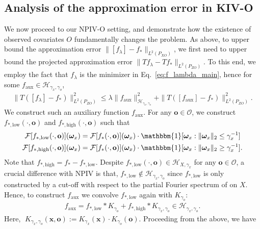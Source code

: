 \documentclass[11pt]{article}
\newcommand{\one}{\mathbbm{1}}
\newcommand{\bx}{\mathbf x}
\newcommand{\bo}{\mathbf o}
\newcommand{\bomega}{\boldsymbol{\omega}}
\newcommand{\calF}{\mathcal{F}}
\newcommand{\calH}{\mathcal{H}}
\newcommand{\calO}{\mathcal{O}}
\newcommand{\0}{\mathbf{0}}
\begin{document}
\subsection{Analysis of the approximation error in KIV-O} \label{sec:analysis_npivo} 
We now proceed to our NPIV-O setting, and demonstrate how the existence of observed covariates $O$ fundamentally changes the problem. As above, to upper bound the approximation error $\|[f_{\lambda}] - f_{\ast}\|_{L^2(P_{XO})}$, we first need to upper bound the projected approximation error $\|T f_{\lambda} - T f_{\ast}\|_{L^2(P_{ZO})}$. To this end, we employ the fact that $f_{\lambda}$ is the minimizer in Eq.~\eqref{eq:f_lambda_main}, hence for some $f_{\mathrm{aux}} \in \calH_{\gamma_x,\gamma_o}$,
\begin{align*}
    \|T([f_{\lambda}] - f_{\ast})\|^2_{L^2(P_{ZO})} \leq \lambda \|f_{\mathrm{aux}}\|^2_{\calH_{\gamma_x,\gamma_o}} + \|T([f_{\mathrm{aux}}] - f_{\ast})\|^2_{L^2(P_{ZO})} .
\end{align*}
We construct such an auxiliary function $f_{\mathrm{aux}}$. For any $\bo\in \calO$, we construct $f_{\ast,\mathrm{low}}(\cdot,\bo)$ and $f_{\ast, \mathrm{high}}(\cdot,\bo)$ such that 
\begin{align}
    \calF[f_{\ast,\mathrm{low}}(\cdot, \bo)](\bomega_x) &= \calF[f_{\ast}(\cdot,\bo)](\bomega_x)\cdot \one[\bomega_x:\|\bomega_x\|_2\leq \gamma_x^{-1}]\label{eq:f_ast_low}\\
    \calF[f_{\ast,\mathrm{high}}(\cdot, \bo)](\bomega_x) &= \calF[f_{\ast}(\cdot,\bo)](\bomega_x)\cdot \one[\bomega_x:\|\bomega_x\|_2\geq \gamma_x^{-1}]\label{eq:f_ast_high}.
\end{align}
Note that $f_{\ast, \mathrm{high}} = f_{\ast} - f_{\ast, \mathrm{low}}$. Despite $ f_{\ast,\mathrm{low}}(\cdot, \bo) \in \calH_{X,\gamma_x}$ for any $\bo\in\calO$, a crucial difference with NPIV is that, $f_{\ast,\mathrm{low}} \notin \calH_{\gamma_x,\gamma_o}$ since $f_{\ast, \mathrm{low}}$ is only constructed by a cut-off with respect to the partial Fourier spectrum of on $X$. Hence, to construct $f_{\mathrm{aux}}$ we convolve $f_{\ast, \mathrm{low}}$ again with $K_{\gamma_o}$:
\begin{align}\label{eq:f_aux}
    f_{\mathrm{aux}} = f_{\ast,\mathrm{low}} \ast K_{\gamma_o} + f_{\ast,\mathrm{high}}\ast K_{\gamma_x,\gamma_o}\in\calH_{\gamma_x,\gamma_o}.
\end{align}
Here, $\;K_{\gamma_x,\gamma_o}(\bx, \bo) := K_{\gamma_x}(\bx)\cdot K_{\gamma_o}(\bo)$. Proceeding from the above, we have
\end{document}
